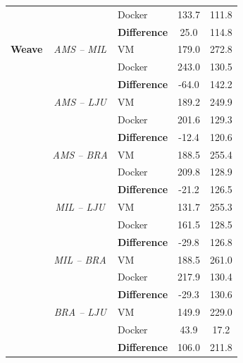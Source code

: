 \begin{appendices}
\begin{longtable}{@{\extracolsep{\fill}}lclcc@{}}
 &  & {\color[HTML]{333333} Docker} & 133.7 & 111.8 \\ \cmidrule(l){3-5} 
 &  & {\color[HTML]{333333} \textbf{Difference}} & {\color[HTML]{009901} 25.0} & {\color[HTML]{009901} 114.8} \\ \midrule
\textbf{Weave} & \textit{AMS – MIL} & {\color[HTML]{333333} VM} & 179.0 & 272.8 \\
 &  & {\color[HTML]{333333} Docker} & 243.0 & 130.5 \\ \cmidrule(l){3-5} 
 &  & {\color[HTML]{333333} \textbf{Difference}} & {\color[HTML]{CB0000} -64.0} & {\color[HTML]{009901} 142.2} \\ \cmidrule(l){2-5} 
 & \textit{AMS – LJU} & {\color[HTML]{333333} VM} & 189.2 & 249.9 \\
 &  & {\color[HTML]{333333} Docker} & 201.6 & 129.3 \\ \cmidrule(l){3-5} 
 &  & {\color[HTML]{333333} \textbf{Difference}} & {\color[HTML]{CB0000} -12.4} & {\color[HTML]{009901} 120.6} \\ \cmidrule(l){2-5} 
 & \textit{AMS – BRA} & {\color[HTML]{333333} VM} & 188.5 & 255.4 \\
 & \textit{} & {\color[HTML]{333333} Docker} & 209.8 & 128.9 \\ \cmidrule(l){3-5} 
 & \textit{} & {\color[HTML]{333333} \textbf{Difference}} & {\color[HTML]{CB0000} -21.2} & {\color[HTML]{009901} 126.5} \\ \cmidrule(l){2-5} 
 & \textit{MIL – LJU} & {\color[HTML]{333333} VM} & 131.7 & 255.3 \\
 & \textit{} & {\color[HTML]{333333} Docker} & 161.5 & 128.5 \\ \cmidrule(l){3-5} 
 & \textit{} & {\color[HTML]{333333} \textbf{Difference}} & {\color[HTML]{9A0000} -29.8} & {\color[HTML]{009901} 126.8} \\ \cmidrule(l){2-5} 
 & \textit{MIL – BRA} & {\color[HTML]{333333} VM} & 188.5 & 261.0 \\
 &  & {\color[HTML]{333333} Docker} & 217.9 & 130.4 \\ \cmidrule(l){3-5} 
 &  & {\color[HTML]{333333} \textbf{Difference}} & {\color[HTML]{CB0000} -29.3} & {\color[HTML]{009901} 130.6} \\ \cmidrule(l){2-5} 
 & \textit{BRA – LJU} & {\color[HTML]{333333} VM} & 149.9 & 229.0 \\
 & \textit{} & {\color[HTML]{333333} Docker} & 43.9 & 17.2 \\ \cmidrule(l){3-5} 
 & \textit{} & {\color[HTML]{333333} \textbf{Difference}} & {\color[HTML]{009901} 106.0} & {\color[HTML]{009901} 211.8} \\ \midrule

\end{longtable}
\end{appendices}
